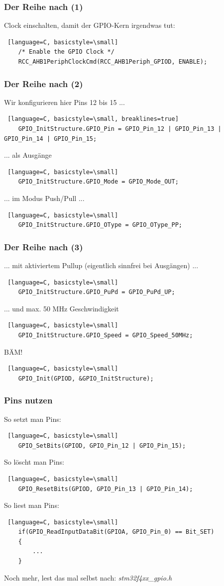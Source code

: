 \documentclass[ngerman,compress]{beamer}
\begin{document}
\begin{frame} [fragile]
	\frametitle{Der Reihe nach (1)}
	Clock einschalten, damit der GPIO-Kern irgendwas tut:
	\begin{lstlisting} [language=C, basicstyle=\small]
	/* Enable the GPIO Clock */
	RCC_AHB1PeriphClockCmd(RCC_AHB1Periph_GPIOD, ENABLE);
	\end{lstlisting}
\end{frame}

\begin{frame} [fragile]
	\frametitle{Der Reihe nach (2)}
	Wir konfigurieren hier Pins 12 bis 15 ...
	\begin{lstlisting} [language=C, basicstyle=\small, breaklines=true]
	GPIO_InitStructure.GPIO_Pin = GPIO_Pin_12 | GPIO_Pin_13 | GPIO_Pin_14 | GPIO_Pin_15;
	\end{lstlisting}
	\pause
	... als Ausgänge
	\begin{lstlisting} [language=C, basicstyle=\small]
	GPIO_InitStructure.GPIO_Mode = GPIO_Mode_OUT;
	\end{lstlisting}
	\pause
	... im Modus Push/Pull ...
	\begin{lstlisting} [language=C, basicstyle=\small]
	GPIO_InitStructure.GPIO_OType = GPIO_OType_PP;
	\end{lstlisting}
\end{frame}

\begin{frame} [fragile]
	\frametitle{Der Reihe nach (3)}
	... mit aktiviertem Pullup (eigentlich sinnfrei bei Ausgängen) ...
	\begin{lstlisting} [language=C, basicstyle=\small]
	GPIO_InitStructure.GPIO_PuPd = GPIO_PuPd_UP;
	\end{lstlisting}
	\pause
	... und max. 50 MHz Geschwindigkeit
	\begin{lstlisting} [language=C, basicstyle=\small]
	GPIO_InitStructure.GPIO_Speed = GPIO_Speed_50MHz;
	\end{lstlisting}
	\pause
	BÄM!
	\begin{lstlisting} [language=C, basicstyle=\small]
	GPIO_Init(GPIOD, &GPIO_InitStructure);
	\end{lstlisting}
\end{frame}

\begin{frame} [fragile]
	\frametitle{Pins nutzen}
	So setzt man Pins:
	\begin{lstlisting} [language=C, basicstyle=\small]
	GPIO_SetBits(GPIOD, GPIO_Pin_12 | GPIO_Pin_15);
	\end{lstlisting}
	\pause
	So löscht man Pins:
	\begin{lstlisting} [language=C, basicstyle=\small]
	GPIO_ResetBits(GPIOD, GPIO_Pin_13 | GPIO_Pin_14);
	\end{lstlisting}
	\pause
	So liest man Pins:
	\begin{lstlisting} [language=C, basicstyle=\small]
	if(GPIO_ReadInputDataBit(GPIOA, GPIO_Pin_0) == Bit_SET)
	{
		...
	}
	\end{lstlisting}
	Noch mehr, lest das mal selbst nach: \emph{stm32f4xx\_gpio.h}
\end{frame}
\end{document}
